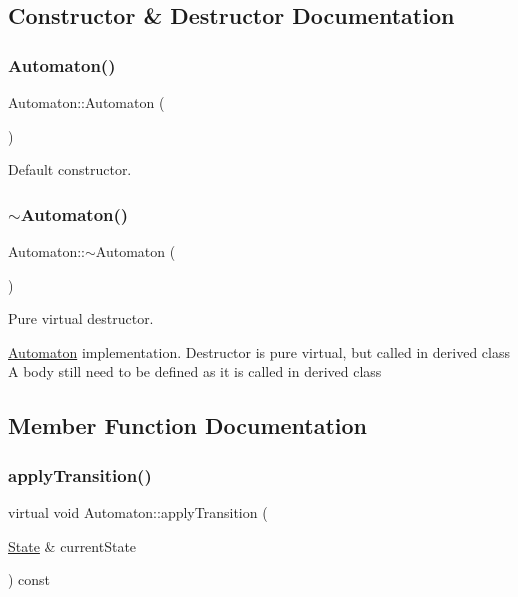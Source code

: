 \subsection{Constructor \& Destructor Documentation}
\mbox{\label{class_automaton_a5d2b6e09517175faea87c5724cc3edea}} 
\subsubsection{\texorpdfstring{Automaton()}{Automaton()}}
{\footnotesize\ttfamily Automaton\+::\+Automaton (\begin{DoxyParamCaption}{ }\end{DoxyParamCaption})\hspace{0.3cm}{\ttfamily [inline]}}

Default constructor. \mbox{\label{class_automaton_ac3355a85bde027da7193736545bb2dac}} 
\subsubsection{\texorpdfstring{$\sim$\+Automaton()}{~Automaton()}}
{\footnotesize\ttfamily Automaton\+::$\sim$\+Automaton (\begin{DoxyParamCaption}{ }\end{DoxyParamCaption})\hspace{0.3cm}{\ttfamily [pure virtual]}}

Pure virtual destructor.

\mbox{\hyperlink{class_automaton}{Automaton}} implementation. Destructor is pure virtual, but called in derived class A body still need to be defined as it is called in derived class 

\subsection{Member Function Documentation}
\mbox{\label{class_automaton_aaf6b5ebd7a820867bfaab0f6892cc0b8}} 
\subsubsection{\texorpdfstring{apply\+Transition()}{applyTransition()}}
{\footnotesize\ttfamily virtual void Automaton\+::apply\+Transition (\begin{DoxyParamCaption}\item[{\mbox{\hyperlink{class_state}{State}} \&}]{current\+State }\end{DoxyParamCaption}) const\hspace{0.3cm}{\ttfamily [pure virtual]}}

